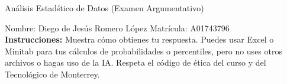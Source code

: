 \documentclass[8pt]{report}
\begin{document}
\newpage



\begin{center}
{An\'alisis Estad\'stico de Datos (Examen Argumentativo)}
\end{center}

Nombre: \underline{\hspace*{.2in}}
Diego de Jesús Romero López
\underline{\hspace*{.2in}} \quad Matr\'icula:\underline{\hspace*{.2in}}
A01743796
\underline{\hspace*{.2in}} \\

{\bf Instrucciones:} Muestra c\'omo obtienes tu respuesta. Puedes usar Excel 
o Minitab para tus cálculos de probabilidades o 
percentiles, pero no uses otros archivos o hagas uso de la IA. Respeta el 
c\'odigo de \'etica del curso y del Tecnol\'ogico 
de Monterrey.
\end{document}
